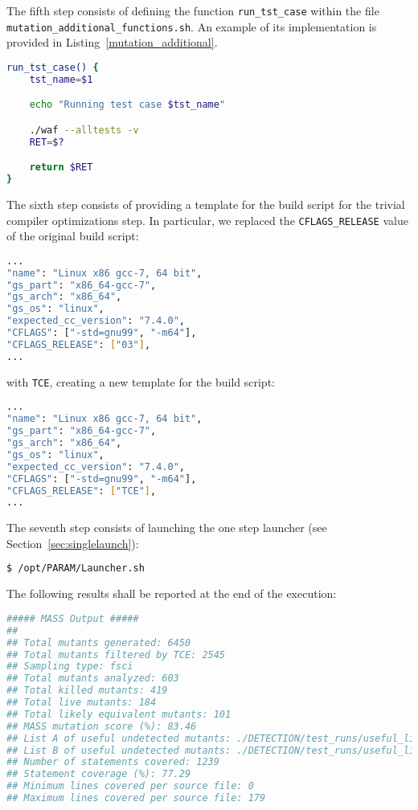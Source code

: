 The fifth step consists of defining the function \texttt{run\_tst\_case} within the file \\\texttt{mutation\_additional\_functions.sh}. An example of its implementation is provided in Listing~\ref{mutation_additional}.

\begin{lstlisting}[language=bash, label=mutation_additional, caption='run\_tst\_case' Bash function for PARAM. Excerpt of mutation\_additional\_functions.sh file.]
run_tst_case() {
    tst_name=$1

    echo "Running test case $tst_name"

    ./waf --alltests -v
    RET=$?

    return $RET
}
\end{lstlisting}

The sixth step consists of providing a template for the build script for the trivial compiler optimizations step. In particular, we replaced the \texttt{CFLAGS\_RELEASE} value of the original build script: 

\begin{lstlisting}[language=bash, caption=libparam/tools/buildtools/gs/buildtools/compiler\_settings.json]
...
"name": "Linux x86 gcc-7, 64 bit",
"gs_part": "x86_64-gcc-7",
"gs_arch": "x86_64",
"gs_os": "linux",
"expected_cc_version": "7.4.0",
"CFLAGS": ["-std=gnu99", "-m64"],
"CFLAGS_RELEASE": ["03"],
... 
\end{lstlisting}

with \texttt{TCE}, creating a new template for the build script:

\begin{lstlisting}[language=bash, caption=libparam/tools/buildtools/gs/buildtools/compiler\_settings.json.template]
...
"name": "Linux x86 gcc-7, 64 bit",
"gs_part": "x86_64-gcc-7",
"gs_arch": "x86_64",
"gs_os": "linux",
"expected_cc_version": "7.4.0",
"CFLAGS": ["-std=gnu99", "-m64"],
"CFLAGS_RELEASE": ["TCE"],
...
\end{lstlisting}

The seventh step consists of launching the one step launcher (see Section~\ref{sec:singlelaunch}):

\begin{lstlisting}[language=bash]
 $ /opt/PARAM/Launcher.sh
\end{lstlisting}

The following results shall be reported at the end of the execution:

\begin{lstlisting}[language=bash, label=mass_output, caption=\MASS output.]
##### MASS Output #####
##
## Total mutants generated: 6450
## Total mutants filtered by TCE: 2545
## Sampling type: fsci
## Total mutants analyzed: 603
## Total killed mutants: 419
## Total live mutants: 184
## Total likely equivalent mutants: 101
## MASS mutation score (%): 83.46
## List A of useful undetected mutants: ./DETECTION/test_runs/useful_list_a
## List B of useful undetected mutants: ./DETECTION/test_runs/useful_list_b
## Number of statements covered: 1239
## Statement coverage (%): 77.29
## Minimum lines covered per source file: 0
## Maximum lines covered per source file: 179
\end{lstlisting}